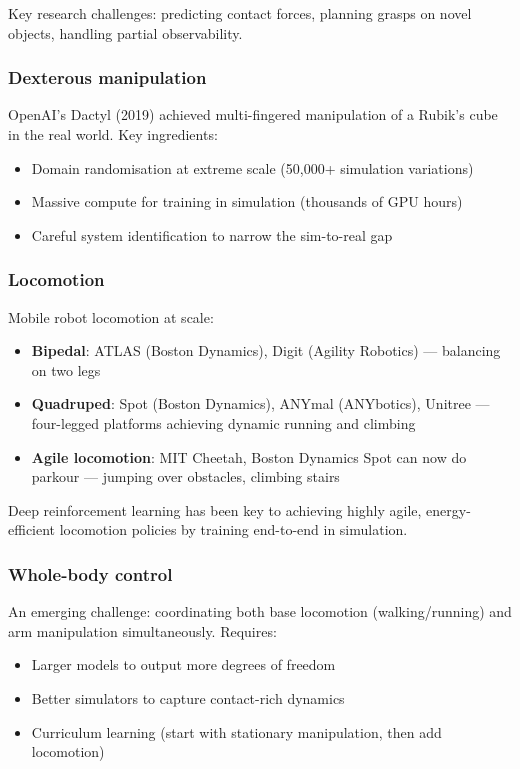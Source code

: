 Key research challenges: predicting contact forces, planning grasps on novel objects, handling partial observability.

\subsubsection{Dexterous manipulation}

OpenAI's Dactyl (2019) achieved multi-fingered manipulation of a Rubik's cube in the real world. Key ingredients:
\begin{itemize}
\item Domain randomisation at extreme scale (50,000+ simulation variations)
\item Massive compute for training in simulation (thousands of GPU hours)
\item Careful system identification to narrow the sim-to-real gap
\end{itemize}

\subsubsection{Locomotion}

Mobile robot locomotion at scale:
\begin{itemize}
\item \textbf{Bipedal}: ATLAS (Boston Dynamics), Digit (Agility Robotics) — balancing on two legs
\item \textbf{Quadruped}: Spot (Boston Dynamics), ANYmal (ANYbotics), Unitree — four-legged platforms achieving dynamic running and climbing
\item \textbf{Agile locomotion}: MIT Cheetah, Boston Dynamics Spot can now do parkour — jumping over obstacles, climbing stairs
\end{itemize}

Deep reinforcement learning has been key to achieving highly agile, energy-efficient locomotion policies by training end-to-end in simulation.

\subsubsection{Whole-body control}

An emerging challenge: coordinating both base locomotion (walking/running) and arm manipulation simultaneously. Requires:
\begin{itemize}
\item Larger models to output more degrees of freedom
\item Better simulators to capture contact-rich dynamics
\item Curriculum learning (start with stationary manipulation, then add locomotion)
\end{itemize}

